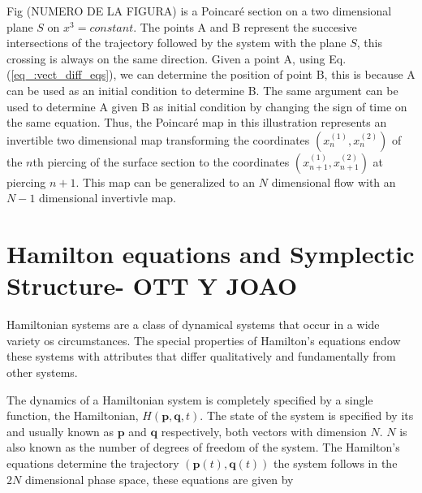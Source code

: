Fig (NUMERO DE LA FIGURA) is a Poincaré section on a two dimensional plane $S$ on $x^{3}=constant$. The points A and B represent the succesive intersections of the trajectory followed by the system with the plane $S$, this crossing is always on the same direction. Given a point A, using Eq. (\ref{eq_:vect_diff_eqs}), we can determine the position of point B, this is because A can be used as an initial condition to determine B. The same argument can be used to determine A given B as initial condition by changing the sign of time on the same equation. Thus, the Poincar\'e map in this illustration represents an invertible two dimensional map transforming the coordinates $(x_n^{(1)},x_n^{(2)})$ of the $n$th piercing of the surface section to the coordinates $(x_{n+1}^{(1)},x_{n+1}^{(2)})$ at piercing $n+1$. This map can be generalized to an $N$ dimensional flow with an $N-1$ dimensional invertivle map.

\section{Hamilton equations and Symplectic Structure- OTT Y JOAO}

Hamiltonian systems are a class of dynamical systems that occur in a wide variety os circumstances. The special properties of Hamilton's equations endow these systems with attributes that differ qualitatively and fundamentally from other systems.\par 

The dynamics of a Hamiltonian system is completely specified by a single function, the Hamiltonian, $H(\bm{p},\bm{q},t)$. The state of the system is specified by its  and  usually known as $\bm{p}$ and $\bm{q}$ respectively, both vectors with dimension $N$. $N$ is also known as the number of degrees of freedom of the system. The Hamilton's equations determine the trajectory $(\bm{p}(t),\bm{q}(t))$ the system follows in the $2N$ dimensional phase space, these equations are given by

